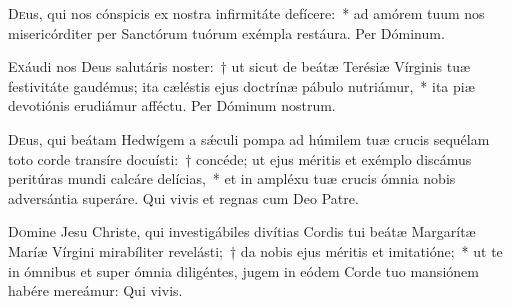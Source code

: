 \documentclass[vesperale_romanum.tex]{subfiles}
\begin{document}
\oratio

\lettrine{D}{e}us, qui nos cónspicis ex nostra infirmitáte defícere:~* ad amórem tuum nos misericórditer per Sanctórum tuórum exémpla restáura. Per Dóminum.

\capitdeseq

\myrule


\duplex

\hymnusbothvespers


\oratio

\lettrine{E}{x}áudi nos Deus salutáris noster:~† ut sicut de beátæ Terésiæ Vírginis tuæ festivitáte gaudémus; ita cæléstis ejus doctrínæ pábulo nutriámur,~* ita piæ devotiónis erudiámur affé\-ctu. Per Dóminum nostrum.


\commsequentis

\myrule


\semiduplex


\oratio

\lettrine{D}{e}us, qui beátam Hedwígem a sǽculi pompa ad húmilem tuæ crucis sequélam toto corde transíre docuísti:~† concéde; ut ejus méritis et exémplo discámus peritúras mundi calcáre delícias,~* et in ampléxu tuæ crucis ómnia nobis adversántia superáre.
Qui vivis et regnas cum Deo Patre.

\vespsequentiscomm

\myrule

\newpage


\duplex

\oratio

\lettrine{D}{o}mine Jesu Christe, qui investigábiles divítias Cordis tui beátæ Margarítæ Maríæ Vírgini mirabíliter revelásti;~† da nobis ejus méritis et imitatióne;~* ut te in ómnibus et super ómnia diligéntes, jugem in eódem Corde tuo mansiónem habére mereámur:
Qui vivis.
\end{document}

